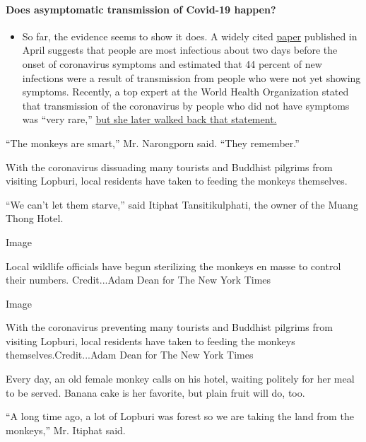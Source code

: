 \begin{itemize}
{  \paragraph{Does asymptomatic transmission of Covid-19
  happen?}\label{does-asymptomatic-transmission-of-covid-19-happen}}

  \begin{itemize}
  \tightlist
  \item
    So far, the evidence seems to show it does. A widely cited
    \href{https://www.nature.com/articles/s41591-020-0869-5}{paper}
    published in April suggests that people are most infectious about
    two days before the onset of coronavirus symptoms and estimated that
    44 percent of new infections were a result of transmission from
    people who were not yet showing symptoms. Recently, a top expert at
    the World Health Organization stated that transmission of the
    coronavirus by people who did not have symptoms was ``very rare,''
    \href{https://www.nytimes3xbfgragh.onion/2020/06/09/world/coronavirus-updates.html?action=click\&pgtype=Article\&state=default\&region=MAIN_CONTENT_3\&context=storylines_faq\#link-1f302e21}{but
    she later walked back that statement.}
  \end{itemize}
\end{itemize}

``The monkeys are smart,'' Mr. Narongporn said. ``They remember.''

With the coronavirus dissuading many tourists and Buddhist pilgrims from
visiting Lopburi, local residents have taken to feeding the monkeys
themselves.

``We can't let them starve,'' said Itiphat Tansitikulphati, the owner of
the Muang Thong Hotel.

Image

Local wildlife officials have begun sterilizing the monkeys en masse to
control their numbers. Credit...Adam Dean for The New York Times

Image

With the coronavirus preventing many tourists and Buddhist pilgrims from
visiting Lopburi, local residents have taken to feeding the monkeys
themselves.Credit...Adam Dean for The New York Times

Every day, an old female monkey calls on his hotel, waiting politely for
her meal to be served. Banana cake is her favorite, but plain fruit will
do, too.

``A long time ago, a lot of Lopburi was forest so we are taking the land
from the monkeys,'' Mr. Itiphat said.

